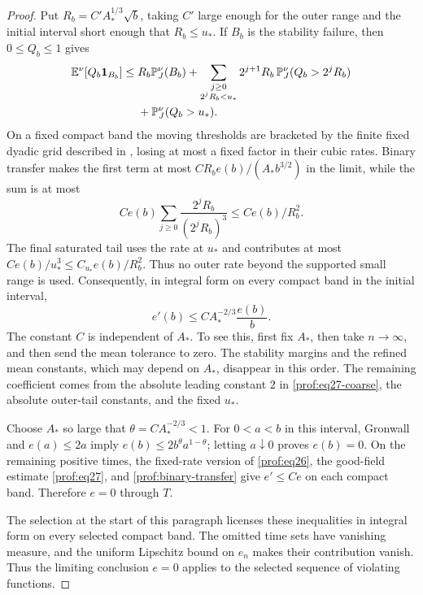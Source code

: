 \begin{proof}
Put \(R_b=C'A_*^{1/3}\sqrt b\), taking \(C'\) large enough
for the outer range and the initial interval short enough that
\(R_b\le u_*\). If \(B_b\) is the stability failure, then
\(0\le Q_b\le1\) gives
\[
\begin{split}
 \mathbb E^\nu[Q_b\mathbf1_{B_b}]
 \le{}&R_b\mathbb P_J^\nu(B_b)
 +\sum_{\substack{j\ge0\\2^jR_b<u_*}}
       2^{j+1}R_b\,\mathbb P_J^\nu(Q_b>2^jR_b)\\
 &+\mathbb P_J^\nu(Q_b>u_*).
\end{split}
\]
On a fixed compact band the moving thresholds are bracketed by
the finite fixed dyadic grid described in
, losing at most a fixed factor in
their cubic rates. Binary transfer makes the first term at most
\(CR_be(b)/(A_*b^{3/2})\) in the limit, while the sum is at most
\[
 Ce(b)\sum_{j\ge0}
       \frac{2^jR_b}{(2^jR_b)^3}
 \le Ce(b)/R_b^2.
\]
The final saturated tail uses the rate at \(u_*\) and contributes
at most \(Ce(b)/u_*^3\le C_{u_*}e(b)/R_b^2\).
Thus no outer rate beyond the supported small range is used.
Consequently, in integral form on every compact band in the initial
interval,
\begin{equation}
 e'(b)\le C A_*^{-2/3}\frac{e(b)}{b}.
 \label{prof:macroscopic-drift}
\end{equation}
The constant \(C\) is independent of \(A_*\). To see this,
first fix \(A_*\), then take \(n\to\infty\), and then send the
mean tolerance to zero. The stability margins and the refined
mean constants, which may depend on \(A_*\), disappear in this
order. The remaining coefficient comes from the absolute leading
constant \(2\) in \eqref{prof:eq27-coarse}, the absolute outer-tail
constants, and the fixed \(u_*\).

Choose $A_*$ so large that
$\theta=CA_*^{-2/3}<1$.  For $0<a<b$ in this interval, Gronwall and
$e(a)\le2a$ imply
$e(b)\le2b^\theta a^{1-\theta}$; letting $a\downarrow0$ proves
$e(b)=0$.  On the remaining positive times, the fixed-rate version of
\eqref{prof:eq26}, the good-field estimate \eqref{prof:eq27}, and
\eqref{prof:binary-transfer} give $e'\le Ce$ on each compact band.
Therefore $e=0$ through $T$.

The selection at the start of this paragraph licenses these
inequalities in integral form on every selected compact band.
The omitted time sets have vanishing measure, and the uniform
Lipschitz bound on \(e_n\) makes their contribution vanish.
Thus the limiting conclusion \(e=0\) applies to the selected
sequence of violating functions.


\end{proof}
